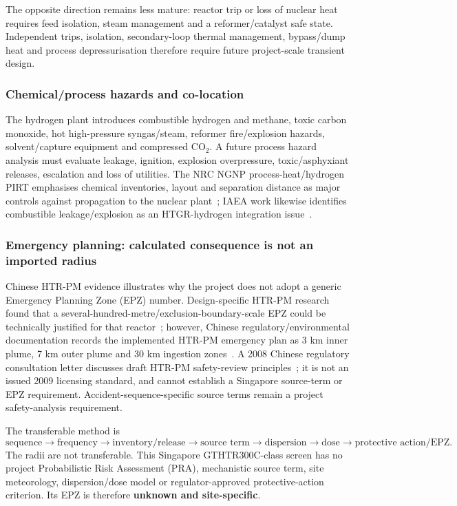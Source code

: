 The opposite direction remains less mature: reactor trip or loss of nuclear heat requires feed isolation, steam management and a reformer/catalyst safe state.  Independent trips, isolation, secondary-loop thermal management, bypass/dump heat and process depressurisation therefore require future project-scale transient design.

\subsubsection{Chemical/process hazards and co-location}
The hydrogen plant introduces combustible hydrogen and methane, toxic carbon monoxide, hot high-pressure syngas/steam, reformer fire/explosion hazards, solvent/capture equipment and compressed CO$_2$. A future process hazard analysis must evaluate leakage, ignition, explosion overpressure, toxic/asphyxiant releases, escalation and loss of utilities. The NRC NGNP process-heat/hydrogen PIRT emphasises chemical inventories, layout and separation distance as major controls against propagation to the nuclear plant~\cite{nrcngnppirt2010}; IAEA work likewise identifies combustible leakage/explosion as an HTGR-hydrogen integration issue~\cite{iaeacoupling2009}.

\subsubsection{Emergency planning: calculated consequence is not an imported radius}
Chinese HTR-PM evidence illustrates why the project does not adopt a generic Emergency Planning Zone (EPZ) number.  Design-specific HTR-PM research found that a several-hundred-metre/exclusion-boundary-scale EPZ could be technically justified for that reactor~\cite{ding2018epz}; however, Chinese regulatory/environmental documentation records the implemented HTR-PM emergency plan as 3 km inner plume, 7 km outer plume and 30 km ingestion zones~\cite{mee2022htrpmepz}.  A 2008 Chinese regulatory consultation letter discusses draft HTR-PM safety-review principles~\cite{mee2009htrpmreview}; it is not an issued 2009 licensing standard, and cannot establish a Singapore source-term or EPZ requirement. Accident-sequence-specific source terms remain a project safety-analysis requirement.

The transferable method is
\[
\text{sequence}\rightarrow\text{frequency}\rightarrow\text{inventory/release}
\rightarrow\text{source term}\rightarrow\text{dispersion}\rightarrow\text{dose}
\rightarrow\text{protective action/EPZ}.
\]
The radii are not transferable.  This Singapore GTHTR300C-class screen has no project Probabilistic Risk Assessment (PRA), mechanistic source term, site meteorology, dispersion/dose model or regulator-approved protective-action criterion.  Its EPZ is therefore \textbf{unknown and site-specific}.

